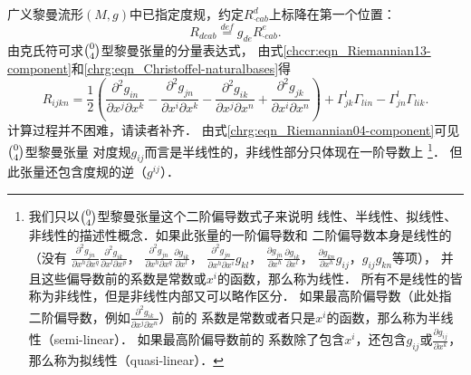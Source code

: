 广义黎曼流形$(M,g)$中已指定度规，约定$R_{\cdot cab}^d$上标降在第一个位置：
\begin{equation}\label{chrg:eqn_RiemannianCurvature-d4}
    R_{dcab} \overset{def}{=} g_{de}R_{\cdot cab}^e.
\end{equation}
由克氏符可求$\binom{0}{4}$型黎曼张量的分量表达式，
由式\eqref{chccr:eqn_Riemannian13-component}和\eqref{chrg:eqn_Christoffel-naturalbases}得
\setlength{\mathindent}{0em}
\begin{equation}\label{chrg:eqn_Riemannian04-component}
    R_{ijkn} =\frac{1}{2}\left(
           \frac{\partial^2 g_{in}} {\partial x^j\partial x^k}
         - \frac{\partial^2 g_{jn}} {\partial x^i\partial x^k}
         - \frac{\partial^2 g_{ik}} {\partial x^j\partial x^n}
         + \frac{\partial^2 g_{jk}} {\partial x^i\partial x^n} \right)
         + \Gamma_{jk}^l\Gamma _{lin} - \Gamma _{jn}^l\Gamma _{lik} .
\end{equation}\setlength{\mathindent}{2em}
计算过程并不困难，请读者补齐．
由式\eqref{chrg:eqn_Riemannian04-component}可见$\binom{0}{4}$型黎曼张量
对度规$g_{ij}$而言是半线性的，非线性部分只体现在一阶导数上
{\footnote{我们只以$\binom{0}{4}$型黎曼张量这个二阶偏导数式子来说明
线性、半线性、拟线性、非线性的描述性概念．如果此张量的一阶偏导数和
二阶偏导数本身是线性的（没有
$\frac{\partial^2 g_{jn}} {\partial  x^h\partial  x^q}\frac{\partial^2 g_{ik}} {\partial  x^l\partial  x^p}$，
$\frac{\partial^2 g_{jn}} {\partial  x^h\partial  x^q}\frac{\partial g_{ik}} {\partial  x^l}$，
$\frac{\partial^2 g_{jn}} {\partial  x^h\partial  x^i}g_{kl}$，
$\frac{\partial g_{jn}} {\partial  x^h}\frac{\partial g_{ik}} {\partial  x^l}$，
$\frac{\partial g_{kn}} {\partial  x^h}g_{ij}$，$g_{ij}g_{kn}$等项），
并且这些偏导数前的系数是常数或$x^i$的函数，那么称为线性．
所有不是线性的皆称为非线性，但是非线性内部又可以略作区分．
如果最高阶偏导数（此处指二阶偏导数，例如$\frac{\partial^2 g_{ik}}{\partial x^j\partial x^n} $）前的
系数是常数或者只是$x^i$的函数，那么称为半线性（semi-linear）．
如果最高阶偏导数前的
系数除了包含$x^i$，还包含$g_{ij}$或$\frac{\partial g_{ij}} {\partial  x^k}$，
那么称为拟线性（quasi-linear）．}}．
但此张量还包含度规的逆（$g^{ij}$）．



